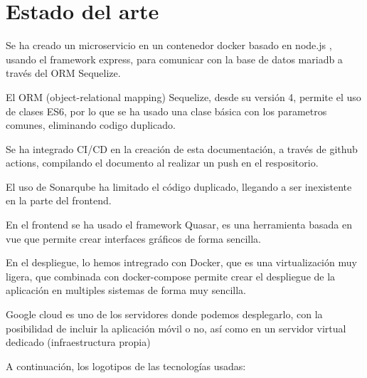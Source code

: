 \documentclass[11pt,spanish,listoffigures,listoftables]{tfgetsinf}
\begin{document}


\chapter{Estado del arte}

Se ha creado un microservicio en un contenedor docker basado en node.js , usando el framework express, para comunicar con la base de datos mariadb a través del ORM Sequelize. 

El ORM (object-relational mapping) Sequelize, desde su versión 4, permite el uso de clases ES6, por lo que se ha usado una clase básica con los parametros comunes, eliminando codigo duplicado.

Se ha integrado CI/CD en la creación de esta documentación, a través de github actions, compilando el documento al realizar un push en el respositorio.

El uso de Sonarqube ha limitado el código duplicado, llegando a ser inexistente en la parte del frontend.

En el frontend se ha usado el framework Quasar, es una herramienta basada en vue que permite crear interfaces gráficos de forma sencilla.

En el despliegue, lo hemos intregrado con Docker, que es una virtualización muy ligera, que combinada con docker-compose permite crear el despliegue de la aplicación en multiples sistemas de forma muy sencilla.

Google cloud es uno de los servidores donde podemos desplegarlo, con la posibilidad de incluir la aplicación móvil o no, así como en un servidor virtual dedicado (infraestructura propia)

A continuación, los logotipos de las tecnologías usadas:
\end{document}
